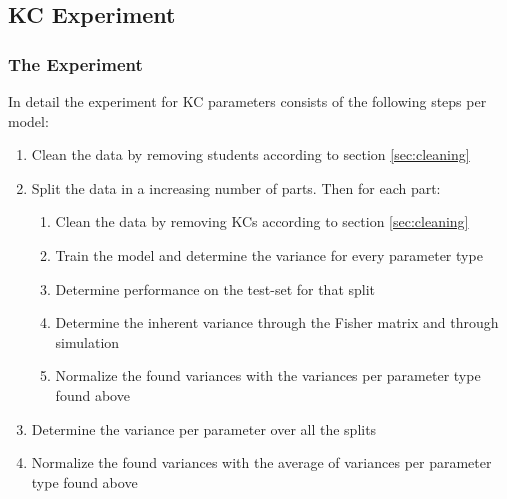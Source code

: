 \documentclass{scrartcl}
\begin{document}

\subsection{KC Experiment}
\subsubsection{The Experiment}
In detail the experiment for KC parameters consists of the following steps per model:
\begin{enumerate}
\item Clean the data by removing students according to section \ref{sec:cleaning}
\item Split the data in a increasing number of parts. Then for each part:
\begin{enumerate}
\item Clean the data by removing KCs according to section \ref{sec:cleaning}
\item Train the model and determine the variance for every parameter type
\item Determine performance on the test-set for that split
\item Determine the inherent variance through the Fisher matrix and through simulation
\item Normalize the found variances with the variances per parameter type found above
\end{enumerate}
\item Determine the variance per parameter over all the splits
\item Normalize the found variances with the average of variances per parameter type found above
\end{enumerate}
\end{document}
